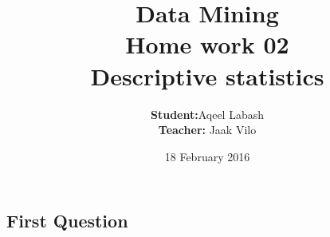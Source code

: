 \documentclass{article}
\title{Data Mining\\
		Home work 02\\ Descriptive statistics}
\author{\textbf{Student:}Aqeel Labash\\ \textbf{Teacher:} Jaak Vilo}
\date{18 February 2016}
\begin{document}
	\maketitle

\begin{multicols*}{2}
	\centering	\section*{First Question}
\end{multicols*}
\end{document}
